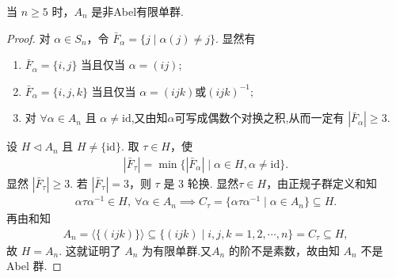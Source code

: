 \documentclass[../../main.tex]{subfiles}%
\begin{document}
\begin{theorem}\label{theorem:A_n是非Abel有限单群}
当 \( n \geqslant 5 \) 时，\( A_n \) 是非Abel有限单群.
\end{theorem}
\begin{proof}
对 \( \alpha \in S_n \)，令 \( \bar{F}_\alpha = \{j \mid \alpha(j) \neq j\} \). 显然有
\begin{enumerate}[(1)]
\item\label{theorem:A_n是非Abel有限单群-证明-情况1} \( \bar{F}_\alpha = \{i, j\} \) 当且仅当 \( \alpha = (ij) \);

\item \( \bar{F}_\alpha = \{i, j, k\} \) 当且仅当 \( \alpha = (ijk)\text{或}(ijk)^{-1} \);

\item 对 \( \forall \alpha \in A_n \) 且 \( \alpha \neq \mathrm{id} \),又由知$\alpha$可写成偶数个对换之积,从而一定有 \( |\bar{F}_\alpha| \geqslant 3 \).
\end{enumerate}
设 \( H \lhd A_n \) 且 \( H \neq \{\mathrm{id}\} \). 取 \( \tau \in H \)，使
\begin{align}\label{eq::infoj4fj3fminfo8ju43}
|\bar{F}_\tau| = \min\{|\bar{F}_\alpha| \mid \alpha \in H, \alpha \neq \mathrm{id}\}.
\end{align}
显然 \( |\bar{F}_\tau| \geqslant 3 \). 若 \( |\bar{F}_\tau| = 3 \)，则 \( \tau \) 是 3 轮换. 
显然$\tau \in H$，由正规子群定义和知
\begin{align*}
\alpha \tau \alpha^{-1} \in H,\ \forall \alpha \in A_n \implies C_{\tau} = \{ \alpha \tau \alpha^{-1} \mid \alpha \in A_n \} \subseteq H.
\end{align*}
再由和知
\begin{align*}
A_n = \langle \{(ijk)\} \rangle \subseteq \{(ijk)\mid i,j,k=1,2,\cdots,n\} = C_\tau \subseteq H,
\end{align*}
故 \( H = A_n \). 这就证明了 \( A_n \) 为有限单群.又\( A_n \) 的阶不是素数，故由知 \( A_n \) 不是 Abel 群.


\end{proof}
\end{document}
